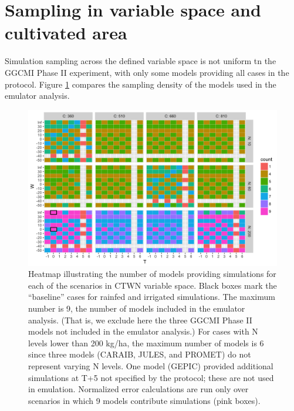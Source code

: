 \documentclass[12pt]{article}
\begin{document}
{\scriptsize \tableofcontents}

\clearpage

\renewcommand{\thefigure}{S\arabic{figure}}
\renewcommand{\thetable}{S\arabic{table}}

\section{Sampling in variable space and cultivated area}
\begin{justify}
	Simulation sampling across the defined variable space is not uniform tn the GGCMI Phase II experiment, with only some models providing all cases in the protocol. 
  Figure \ref{fig:numbersims} compares the sampling density of the models used in the emulator analysis. 
\end{justify}

\begin{figure}[h!]
  \centering
  \includegraphics[width=\textwidth]{s_how_many_simulations.png}
  \caption{
  Heatmap illustrating the number of models providing simulations for each of the scenarios in CTWN variable space. Black boxes mark the ``baseline'' cases for rainfed and irrigated simulations.
	The maximum number is 9, the number of models included in the emulator analysis. (That is, we exclude here the three GGCMI Phase II models not included in the emulator analysis.)  For cases with N levels lower than 200 kg/ha, the maximum number of models is 6 since three models (CARAIB, JULES, and PROMET) do not represent varying N levels. One model (GEPIC) provided additional simulations at T+5 not specified by the protocol; these are not used in emulation.
  	Normalized error calculations are run only over scenarios in which 9 models contribute simulations (pink boxes).  }
  \label{fig:numbersims}
\end{figure}
\end{document}

